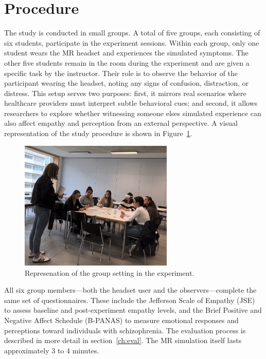 \section{Procedure}

The study is conducted in small groups. A total of five groups, each consisting of six students, participate in the experiment sessions. Within each group, only one student wears the MR headset and experiences the simulated symptoms. The other five students remain in the room during the experiment and are given a specific task by the instructor. Their role is to observe the behavior of the participant wearing the headset, noting any signs of confusion, distraction, or distress. This setup serves two purposes: first, it mirrors real scenarios where healthcare providers must interpret subtle behavioral cues; and second, it allows researchers to explore whether witnessing someone elses simulated experience can also affect empathy and perception from an external perspective. A visual representation of the study procedure is shown in Figure~\ref{fig:group-setting}.

\begin{figure}[htbp]
    \centering
    \includegraphics[width=0.65\textwidth]{../../Figures/Group-setting-02.jpg}
    \caption{Represenation of the group setting in the experiment.}
    \label{fig:group-setting}
\end{figure}

\vspace{1em}

All six group members—both the headset user and the observers—complete the same set of questionnaires. These include the Jefferson Scale of Empathy (JSE) \cite{Hojat2002} to assess baseline and post-experiment empathy levels, and the Brief Positive and Negative Affect Schedule (B-PANAS) \cite{Boiroux2024} to measure emotional responses and perceptions toward individuals with schizophrenia. The evaluation process is described in more detail in section~\ref{ch:eval}. The MR simulation itself lasts approximately 3 to 4 minutes.

